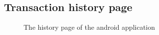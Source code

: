 \documentclass[11pt, a4paper]{article}
\begin{document}
\begin{appendices}
\subsection{Transaction history page} %
\begin{figure}[ht]
\centering
{}
\caption{The history page of the android application}
\end{figure}
\clearpage



\end{appendices}
\end{document}
